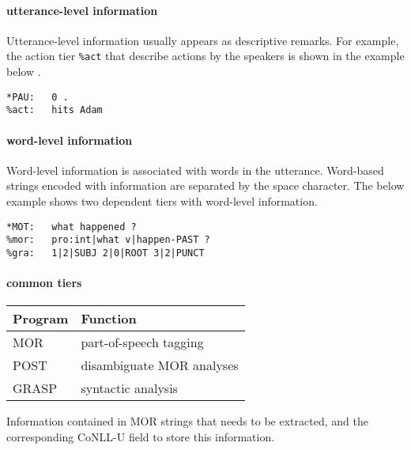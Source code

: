 \paragraph{utterance-level information}
Utterance-level information usually appears as descriptive remarks. For example, the action tier \texttt{\%act} that describe actions by the speakers is shown in the example below .\\

\lstset{
numbers = none,
frame = single,
}

\begin{lstlisting}[caption={Example of a dependent tier with utterance-level information.}, label={lst:chatsent1}]
*PAU:   0 .
%act:   hits Adam
\end{lstlisting}


\paragraph{word-level information}
Word-level information is associated with words in the utterance. Word-based strings encoded with information are separated by the space character. The below example  shows two dependent tiers with word-level information.

\clearpage

\lstset{
numbers = none,
frame = single,
}

\begin{lstlisting}[caption={Example of dependent tiers with word-level information}, label={lst:chatsent2}]
*MOT:   what happened ?
%mor:   pro:int|what v|happen-PAST ?
%gra:   1|2|SUBJ 2|0|ROOT 3|2|PUNCT
\end{lstlisting}

\paragraph{common tiers}
\begin{margintable}[1\baselineskip]
\begin{tabularx}{1\textwidth}{@{}ll@{}}
\toprule
\textbf{Program} & \textbf{Function}\\\midrule
MOR & part-of-speech tagging \\
POST & disambiguate MOR analyses\\
GRASP & syntactic analysis\\\bottomrule
\end{tabularx}
\caption{\label{tab:martabmor}Information contained in MOR strings that needs to be extracted, and the corresponding CoNLL-U field to store this information.}
\footnotesize
\end{margintable}

